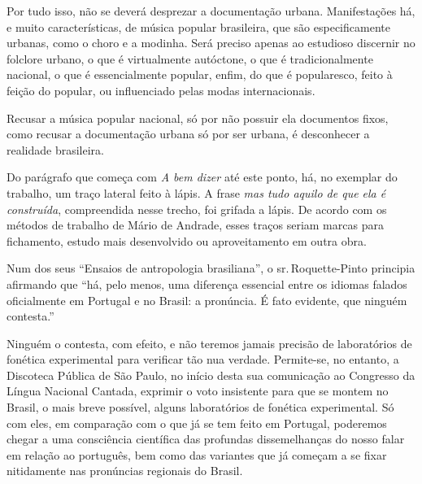 Por tudo isso, não se deverá desprezar a documentação urbana.
Manifestações há, e muito características, de música popular brasileira,
que são especificamente urbanas, como o choro e a modinha. Será preciso
apenas ao estudioso discernir no folclore urbano, o que é virtualmente
autóctone, o que é tradicionalmente nacional, o que é essencialmente
popular, enfim, do que é popularesco, feito à feição do popular, ou
influenciado pelas modas internacionais.

Recusar a música popular nacional, só por não possuir ela documentos
fixos, como recusar a documentação urbana só por ser urbana, é
desconhecer a realidade brasileira.

Do parágrafo que começa com \textit{A bem dizer} até este ponto, há, no
exemplar do trabalho, um traço lateral feito à lápis. A frase \textit{mas tudo
aquilo de que ela é construída}, compreendida nesse trecho, foi grifada
a lápis. De acordo com os métodos de trabalho de Mário de Andrade, esses
traços seriam marcas para fichamento, estudo mais desenvolvido ou
aproveitamento em outra obra.



Num dos seus ``Ensaios de antropologia brasiliana'', o sr.\,Roquette-Pinto
principia afirmando que ``há, pelo menos, uma diferença essencial entre
os idiomas falados oficialmente em Portugal e no Brasil: a pronúncia. É
fato evidente, que ninguém contesta.''

Ninguém o contesta, com efeito, e não teremos jamais precisão de
laboratórios de fonética experimental para verificar tão nua verdade.
Permite-se, no entanto, a Discoteca Pública de São Paulo, no início
desta sua comunicação ao Congresso da Língua Nacional Cantada, exprimir
o voto insistente para que se montem no Brasil, o mais breve possível,
alguns laboratórios de fonética experimental. Só com eles, em comparação
com o que já se tem feito em Portugal, poderemos chegar a uma
consciência científica das profundas dissemelhanças do nosso falar em
relação ao português, bem como das variantes que já começam a se fixar
nitidamente nas pronúncias regionais do Brasil.

